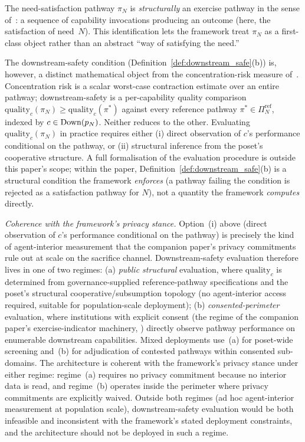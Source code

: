\begin{remark}
\label{rem:exercise_pathway}
The need-satisfaction pathway $\pi_N$ is \emph{structurally} an
exercise pathway in the sense
of~\citep[Definition~2]{lasser2026horizon}: a sequence of
capability invocations producing an outcome (here, the
satisfaction of need~$N$).  This identification lets the framework
treat $\pi_N$ as a first-class object rather than an abstract
``way of satisfying the need.''

The downstream-safety condition
(Definition~\ref{def:downstream_safe}(b)) is, however, a distinct
mathematical object from the concentration-risk measure
of~\citep[Definition~3]{lasser2026horizon}.  Concentration risk
is a scalar worst-case contraction estimate over an entire
pathway; downstream-safety is a per-capability quality
comparison $\mathrm{quality}_c(\pi_N) \geq \mathrm{quality}_c(\pi^*)$
against every reference pathway $\pi^* \in \Pi_N^{\mathrm{ref}}$,
indexed by $c \in \mathrm{Down}(p_N)$.  Neither reduces to the other.
Evaluating $\mathrm{quality}_c(\pi_N)$ in practice requires
either (i) direct observation of $c$'s performance conditional on
the pathway, or (ii) structural inference from the poset's
cooperative structure.  A full formalisation of the evaluation
procedure is outside this paper's scope; within the paper,
Definition~\ref{def:downstream_safe}(b) is a structural condition
the framework \emph{enforces} (a pathway failing the condition is
rejected as a satisfaction pathway for $N$), not a quantity the
framework \emph{computes} directly.

\emph{Coherence with the framework's privacy stance.}  Option~(i)
above (direct observation of $c$'s performance conditional on the
pathway) is precisely the kind of agent-interior measurement that
the companion paper's privacy commitments rule out at scale on the
sacrifice channel.  Downstream-safety evaluation therefore lives
in one of two regimes: (a) \emph{public structural} evaluation,
where $\mathrm{quality}_c$ is determined from governance-supplied
reference-pathway specifications and the poset's structural
cooperative/subsumption topology (no agent-interior access
required, suitable for population-scale deployment); (b)
\emph{consented-perimeter} evaluation, where institutions with
explicit consent (the regime of the companion paper's
exercise-indicator machinery,
\citep[Revealed~Sacrifice, Appendix~A]{lasser2026paper8a}) directly observe
pathway performance on enumerable downstream capabilities.
Mixed deployments use~(a) for poset-wide screening and~(b) for
adjudication of contested pathways within consented sub-domains.
The architecture is coherent with the framework's privacy stance
under either regime: regime~(a) requires no privacy commitment
because no interior data is read, and regime~(b) operates inside
the perimeter where privacy commitments are explicitly waived.
Outside both regimes (ad hoc agent-interior measurement at
population scale), downstream-safety evaluation would be both
infeasible and inconsistent with the framework's stated
deployment constraints, and the architecture should not be
deployed in such a regime.


\end{remark}
